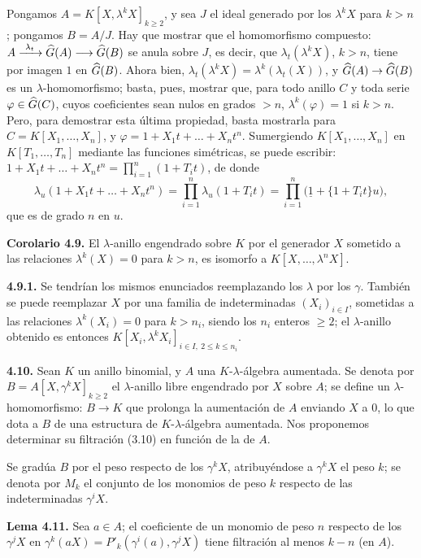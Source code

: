 Pongamos \(A=K[X,\lambda^k X]_{k\ge2}\), y sea \(J\) el ideal generado por los \(\lambda^k X\) para \(k>n\); pongamos \(B=A/J\). Hay que mostrar que el homomorfismo compuesto: \(A\xrightarrow{\ \lambda_t\ }\Ghat(A)\longrightarrow\Ghat(B)\) se anula sobre \(J\), es decir, que \(\lambda_t(\lambda^k X)\), \(k>n\), tiene por imagen \(1\) en \(\widehat G(B)\). Ahora bien, \(\lambda_t(\lambda^k X)=\lambda^k(\lambda_t(X))\), y \(\widehat G(A)\to\widehat G(B)\) es un \(\lambda\)-homomorfismo; basta, pues, mostrar que, para todo anillo \(C\) y toda serie \(\varphi\in\widehat G(C)\), cuyos coeficientes sean nulos en grados \(>n\), \(\lambda^k(\varphi)=1\) si \(k>n\). Pero, para demostrar esta última propiedad, basta mostrarla para \(C=K[X_1,\ldots,X_n]\), y \(\varphi=1+X_1t+\ldots+X_nt^n\). Sumergiendo \(K[X_1,\ldots,X_n]\) en \(K[T_1,\ldots,T_n]\) mediante las funciones simétricas, se puede escribir: \(1+X_1t+\ldots+X_nt^n=\prod_{i=1}^{n}(1+T_it)\), de donde
\[
  \lambda_u(1+X_1t+\ldots+X_nt^n)=\prod_{i=1}^{n}\lambda_u(1+T_it)=\prod_{i=1}^{n}\bigl(\underline 1+\{1+T_it\}u\bigr),
\]
que es de grado \(n\) en \(u\).

\textbf{Corolario 4.9.} El \(\lambda\)-anillo engendrado sobre \(K\) por el generador \(X\) sometido a las relaciones \(\lambda^k(X)=0\) para \(k>n\), es isomorfo a \(K[X,\ldots,\lambda^n X]\).

\textbf{4.9.1.} Se tendrían los mismos enunciados reemplazando los \(\lambda\) por los \(\gamma\). También se puede reemplazar \(X\) por una familia de indeterminadas \((X_i)_{i\in I}\), sometidas a las relaciones \(\lambda^k(X_i)=0\) para \(k>n_i\), siendo los \(n_i\) enteros \(\ge2\); el \(\lambda\)-anillo obtenido es entonces \(K[X_i,\lambda^k X_i]_{i\in I,\ 2\le k\le n_i}\).

\textbf{4.10.} Sean \(K\) un anillo binomial, y \(A\) una \(K\)-\(\lambda\)-álgebra aumentada. Se denota por \(B=A[X,\gamma^k X]_{k\ge2}\) el \(\lambda\)-anillo libre engendrado por \(X\) sobre \(A\); se define un \(\lambda\)-homomorfismo: \(B\to K\) que prolonga la aumentación de \(A\) enviando \(X\) a \(0\), lo que dota a \(B\) de una estructura de \(K\)-\(\lambda\)-álgebra aumentada. Nos proponemos determinar su filtración (3.10) en función de la de \(A\).

Se gradúa \(B\) por el peso respecto de los \(\gamma^k X\), atribuyéndose a \(\gamma^k X\) el peso \(k\); se denota por \(M_k\) el conjunto de los monomios de peso \(k\) respecto de las indeterminadas \(\gamma^i X\).

\textbf{Lema 4.11.} Sea \(a\in A\); el coeficiente de un monomio de peso \(n\) respecto de los \(\gamma^j X\) en \(\gamma^k(aX)=P'_k(\gamma^i(a),\gamma^j X)\) tiene filtración al menos \(k-n\) (en \(A\)).

